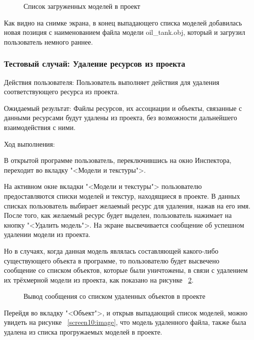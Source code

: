 \begin{figure}[H]
	\caption{Список загруженных моделей в проект}
	\label{screen8:image}
\end{figure}

Как видно на снимке экрана, в конец выпадающего списка моделей добавилась новая позиция с наименованием файла модели oil\_tank.obj, который и загрузил пользователь немного раннее.

\subsubsection{Тестовый случай: Удаление ресурсов из проекта}
Действия пользователя: Пользователь выполняет действия для удаления соответствующего ресурса из проекта.

Ожидаемый результат: Файлы ресурсов, их ассоциации и объекты, связанные с данными ресурсами будут удалены из проекта, без возможности дальнейшего взаимодействия с ними.

Ход выполнения:

В открытой программе пользователь, переключившись на окно Инспектора, переходит во вкладку "<Модели и текстуры">.

На активном окне вкладки "<Модели и текстуры"> пользователю предоставляются списки моделей и текстур, находящиеся в проекте. В данных списках пользователь выбирает желаемый ресурс для удаления, нажав на его имя. После того, как желаемый ресурс будет выделен, пользователь нажимает на кнопку "<Удалить модель">. На экране высвечивается сообщение об успешном удалении модели из проекта. 

Но в случаях, когда данная модель являлась составляющей какого-либо существующего объекта в программе, то пользователю будет высвечено сообщение со списком объектов, которые были уничтожены, в связи с удалением их трёхмерной модели из проекта, как показано на рисунке ~\ref{screen9:image}.

\begin{figure}[H]
	\caption{Вывод сообщения со списком удаленных объектов в проекте}
	\label{screen9:image}
\end{figure}

Перейдя во вкладку "<Объект">, и открыв выпадающий список моделей, можно увидеть на рисунке ~\ref{screen10:image}, что модель удаленного файла, также была удалена из списка прогружаемых моделей в проекте.

